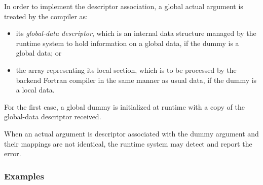 In order to implement the descriptor association, a global actual
argument is treated by the {\XMP} compiler as:

\begin{itemize}
 \item its {\it global-data descriptor}, which is an internal data
       structure managed by the {\XMP} runtime system to hold
       information on a global data, if the dummy is a global data; or
 \item the array representing its local section, which is to be processed
       by the backend Fortran compiler in the same manner as usual data,
       if the dummy is a local data.
\end{itemize}

For the first case, a global dummy is initialized at runtime with a copy
of the global-data descriptor received.

When an actual argument is descriptor associated with the dummy argument
and their mappings are not identical, the {\XMP} runtime system may
detect and report the error.

\subsubsection*{Examples}

